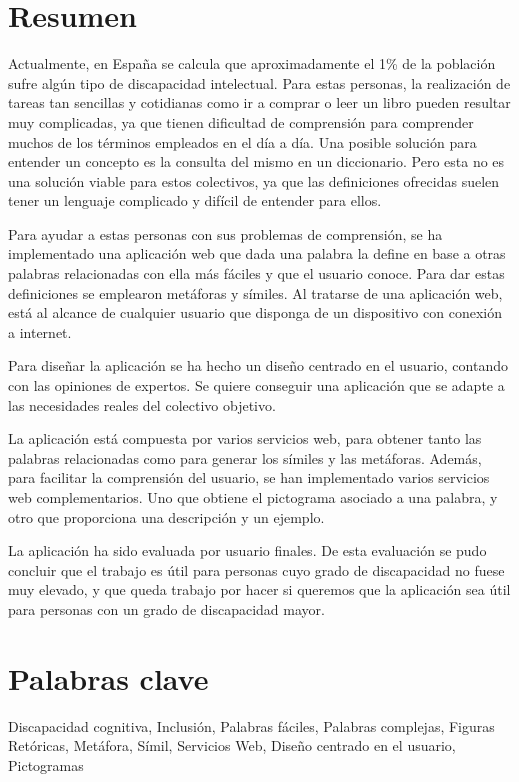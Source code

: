 \section*{Resumen}

Actualmente, en España se calcula que aproximadamente el 1\% de la población sufre algún tipo de discapacidad intelectual. Para estas personas, la realización de tareas tan sencillas y cotidianas como ir a comprar o leer un libro pueden resultar muy complicadas, ya que tienen dificultad de comprensión para comprender muchos de los términos empleados en el día a día. Una posible solución para entender un concepto es la consulta del mismo en un diccionario. Pero esta no es una solución viable para estos colectivos, ya que las definiciones ofrecidas suelen tener un lenguaje complicado y difícil de entender para ellos.

Para ayudar a estas personas con sus problemas de comprensión, se ha implementado una aplicación web que dada una palabra la define en base a otras palabras relacionadas con ella más fáciles y que el usuario conoce. Para dar estas definiciones se emplearon metáforas y símiles. Al tratarse de una aplicación web, está al alcance de cualquier usuario que disponga de un dispositivo con conexión a internet.

Para diseñar la aplicación se ha hecho un diseño centrado en el usuario, contando con las opiniones de expertos. Se quiere conseguir una aplicación que se adapte a las necesidades reales del colectivo objetivo.

La aplicación está compuesta por varios servicios web, para obtener tanto las palabras relacionadas como para generar los símiles y las metáforas. Además, para facilitar la comprensión del usuario, se han implementado varios servicios web complementarios. Uno que obtiene el pictograma asociado a una palabra, y otro que proporciona una descripción y un ejemplo.

La aplicación ha sido evaluada por usuario finales. De esta evaluación se pudo concluir que el trabajo es útil para personas cuyo grado de discapacidad no fuese muy elevado, y que queda trabajo por hacer si queremos que la aplicación sea útil para personas con un grado de discapacidad mayor.


\section*{Palabras clave}
   
\noindent Discapacidad cognitiva, Inclusión, Palabras fáciles, Palabras complejas, Figuras Retóricas, Metáfora, Símil, Servicios Web, Diseño centrado en el usuario, Pictogramas

   


